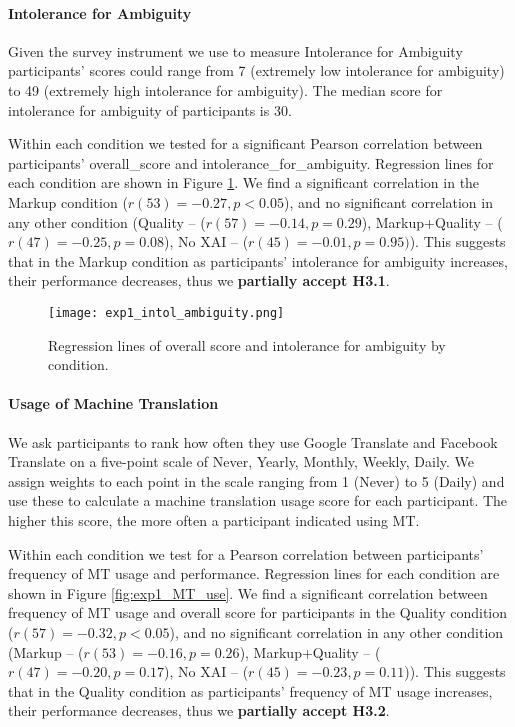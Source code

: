 \paragraph{Intolerance for Ambiguity} 

Given the survey instrument we use to measure Intolerance for Ambiguity\cite{gellerTolerance1993} participants’ scores could range from 7 (extremely low intolerance for ambiguity) to 49 (extremely high intolerance for ambiguity). The median score for intolerance for ambiguity of participants is 30. 

Within each condition we tested for a significant Pearson correlation between participants’ overall\_score and intolerance\_for\_ambiguity. Regression lines for each condition are shown in Figure \ref{fig:exp1_intol_ambiguity}. We find a significant correlation in the Markup condition ($r(53) = -0.27, p < 0.05$), and no significant correlation in any other condition (Quality -- ($r(57) = -0.14, p = 0.29$), Markup+Quality -- ($r(47) = -0.25, p = 0.08$), No XAI -- ($r(45) = -0.01, p = 0.95)$). This suggests that in the Markup condition as participants’ intolerance for ambiguity increases, their performance decreases, thus we \textbf{partially accept H3.1}. 

\begin{figure}[h!]
    \centering
    \texttt{[image: exp1\_intol\_ambiguity.png]}
    \caption{Regression lines of overall score and intolerance for ambiguity by condition.}
    \label{fig:exp1_intol_ambiguity}
\end{figure}

\paragraph{Usage of Machine Translation} 

We ask participants to rank how often they use Google Translate and Facebook Translate on a five-point scale of Never, Yearly, Monthly, Weekly, Daily. We assign weights to each point in the scale ranging from 1 (Never) to 5 (Daily) and use these to calculate a machine translation usage score for each participant. The higher this score, the more often a participant indicated using MT. 

Within each condition we test for a Pearson correlation between participants’ frequency of MT usage and performance. Regression lines for each condition are shown in Figure \ref{fig:exp1_MT_use}. We find a significant correlation between frequency of MT usage and overall score for participants in the Quality condition ($r(57) = -0.32, p < 0.05$), and no significant correlation in any other condition (Markup -- ($r(53) = -0.16, p = 0.26$), Markup+Quality -- ($r(47) = -0.20, p = 0.17$), No XAI -- ($r(45) = -0.23, p = 0.11$)). This suggests that in the Quality condition as participants’ frequency of MT usage increases, their performance decreases, thus we \textbf{partially accept H3.2}.


